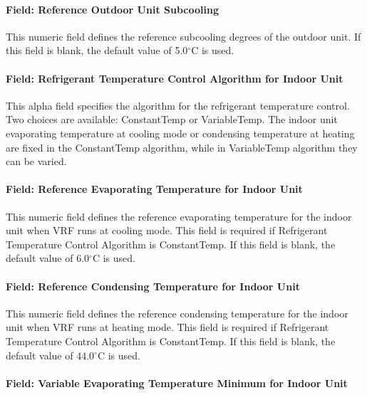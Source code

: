 \paragraph{Field: Reference Outdoor Unit Subcooling}\label{field-outdoor-unit-reference-subcooling}

This numeric field defines the reference subcooling degrees of the outdoor unit. If this field is blank, the default value of 5.0$^\circ$C is used.

\paragraph{Field: Refrigerant Temperature Control Algorithm for Indoor Unit}\label{field-refrigerant-temperature-control-algorithm-for-indoor-unit}

This alpha field specifies the algorithm for the refrigerant temperature control. Two choices are available: ConstantTemp or VariableTemp. The indoor unit evaporating temperature at cooling mode or condensing temperature at heating are fixed in the ConstantTemp algorithm, while in VariableTemp algorithm they can be varied.

\paragraph{Field: Reference Evaporating Temperature for Indoor Unit}\label{field-reference-evaporating-temperature-for-indoor-unit}

This numeric field defines the reference evaporating temperature for the indoor unit when VRF runs at cooling mode. This field is required if Refrigerant Temperature Control Algorithm is ConstantTemp. If this field is blank, the default value of 6.0$^\circ$C is used.

\paragraph{Field: Reference Condensing Temperature for Indoor Unit}\label{field-reference-condensing-temperature-for-indoor-unit}

This numeric field defines the reference condensing temperature for the indoor unit when VRF runs at heating mode. This field is required if Refrigerant Temperature Control Algorithm is ConstantTemp. If this field is blank, the default value of 44.0$^\circ$C is used.

\paragraph{Field: Variable Evaporating Temperature Minimum for Indoor Unit}\label{field-variable-evaporating-temperature-minimum-for-indoor-unit}

